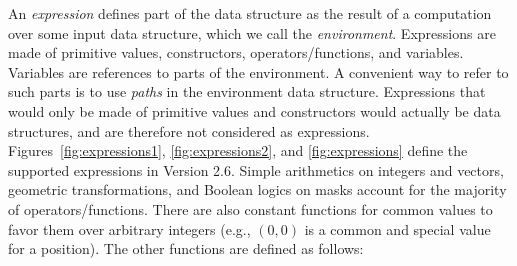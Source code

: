 \documentclass[a4paper]{llncs}
\begin{document}
An {\em expression} defines part of the data structure as the result
of a computation over some input data structure, which we call the
{\em environment}. Expressions are made of primitive values,
constructors, operators/functions, and variables.
Variables are references to parts of the environment. A convenient way
to refer to such parts is to use {\em paths} in the environment data
structure.
%
Expressions that would only be made of primitive values and
constructors would actually be data structures, and are therefore not
considered as expressions.
%
Figures~\ref{fig:expressions1}, \ref{fig:expressions2}, and
\ref{fig:expressions} define the supported expressions in Version
2.6. Simple arithmetics on integers and vectors, geometric
transformations, and Boolean logics on masks account for the majority
of operators/functions. There are also constant functions for common
values to favor them over arbitrary integers (e.g., $(0,0)$ is a
common and special value for a position). The other functions are
defined as follows:
\end{document}
